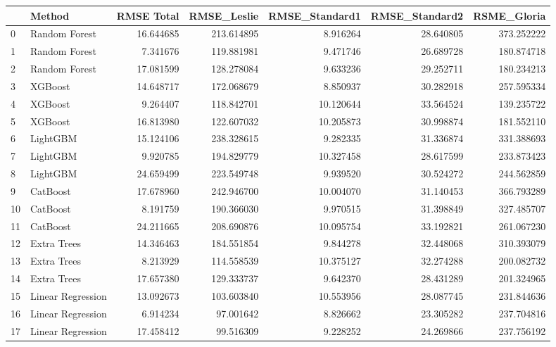 \begin{tabular}{llrrrrr}
\toprule
{} &             Method &  RMSE Total &  RMSE\_Leslie &  RMSE\_Standard1 &  RMSE\_Standard2 &  RSME\_Gloria \\
\midrule
0  &      Random Forest &   16.644685 &   213.614895 &        8.916264 &       28.640805 &   373.252222 \\
1  &      Random Forest &    7.341676 &   119.881981 &        9.471746 &       26.689728 &   180.874718 \\
2  &      Random Forest &   17.081599 &   128.278084 &        9.633236 &       29.252711 &   180.234213 \\
3  &            XGBoost &   14.648717 &   172.068679 &        8.850937 &       30.282918 &   257.595334 \\
4  &            XGBoost &    9.264407 &   118.842701 &       10.120644 &       33.564524 &   139.235722 \\
5  &            XGBoost &   16.813980 &   122.607032 &       10.205873 &       30.998874 &   181.552110 \\
6  &           LightGBM &   15.124106 &   238.328615 &        9.282335 &       31.336874 &   331.388693 \\
7  &           LightGBM &    9.920785 &   194.829779 &       10.327458 &       28.617599 &   233.873423 \\
8  &           LightGBM &   24.659499 &   223.549748 &        9.939520 &       30.524272 &   244.562859 \\
9  &           CatBoost &   17.678960 &   242.946700 &       10.004070 &       31.140453 &   366.793289 \\
10 &           CatBoost &    8.191759 &   190.366030 &        9.970515 &       31.398849 &   327.485707 \\
11 &           CatBoost &   24.211665 &   208.690876 &       10.095754 &       33.192821 &   261.067230 \\
12 &        Extra Trees &   14.346463 &   184.551854 &        9.844278 &       32.448068 &   310.393079 \\
13 &        Extra Trees &    8.213929 &   114.558539 &       10.375127 &       32.274288 &   200.082732 \\
14 &        Extra Trees &   17.657380 &   129.333737 &        9.642370 &       28.431289 &   201.324965 \\
15 &  Linear Regression &   13.092673 &   103.603840 &       10.553956 &       28.087745 &   231.844636 \\
16 &  Linear Regression &    6.914234 &    97.001642 &        8.826662 &       23.305282 &   237.704816 \\
17 &  Linear Regression &   17.458412 &    99.516309 &        9.228252 &       24.269866 &   237.756192 \\
\bottomrule
\end{tabular}
